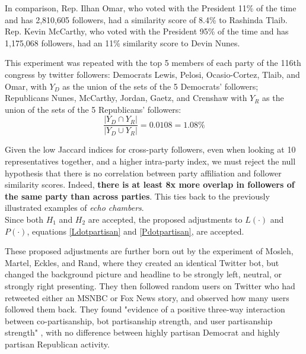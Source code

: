 \documentclass[NETN,manuscript]{stjour-new}
\begin{document}
In comparison, Rep. Ilhan Omar, who voted with the President 11\% of the time and has 2,810,605 followers, had a similarity score of 8.4\% to Rashinda Tlaib. Rep. Kevin McCarthy, who voted with the President 95\% of the time and has 1,175,068 followers, had an 11\% similarity score to Devin Nunes.

This experiment was repeated with the top 5 members of each party of the 116th congress by twitter followers: Democrats Lewis, Pelosi, Ocasio-Cortez, Tlaib, and Omar, with $Y_D$ as the union of the sets of the 5 Democrats' followers; Republicans Nunes, McCarthy, Jordan, Gaetz, and Crenshaw with $Y_R$ as the union of the sets of the 5 Republicans' followers:
\begin{equation}
\label{party overlap twitter}
    \frac{|Y_D \cap Y_R|}{|Y_D \cup Y_R|} = 0.0108 = 1.08\%
\end{equation}

Given the low Jaccard indices for cross-party followers, even when looking at 10 representatives together, and a higher intra-party index, we must reject the null hypothesis that there is no correlation between party affiliation and follower similarity scores. Indeed, \textbf{there is at least 8x more overlap in followers of the same party than across parties}. This ties back to the previously illustrated examples of \textit{echo chambers}.\\
Since both $H_1$ and $H_2$ are accepted, the proposed adjustments to $L(\cdot)$ and $P(\cdot)$, equations \ref{Ldotpartisan} and \ref{Pdotpartisan}, are accepted.

These proposed adjustments are further born out by the experiment of Mosleh, Martel, Eckles, and Rand, where they created an identical Twitter bot, but changed the background picture and headline to be strongly left, neutral, or strongly right presenting. They then followed random users on Twitter who had retweeted either an MSNBC or Fox News story, and observed how many users followed them back. They found "evidence of a positive three-way interaction between co-partisanship, bot partisanship strength, and user partisanship strength" \citep{mosleh2020shared}, with no difference between highly partisan Democrat and highly partisan Republican activity. 
\end{document}
